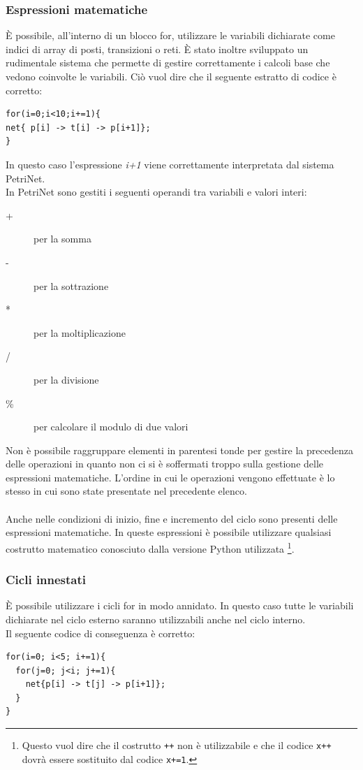 \documentclass[italian,12pt]{book}
\begin{document}
\subsubsection{Espressioni matematiche}
È possibile, all'interno di un blocco for, utilizzare le variabili dichiarate 
come indici di array di posti, transizioni o reti. È stato inoltre sviluppato
un rudimentale sistema che permette di gestire correttamente i calcoli 
base che vedono coinvolte le variabili. Ciò vuol dire che il seguente estratto 
di codice è corretto:
\begin{verbatim}
for(i=0;i<10;i+=1){
net{ p[i] -> t[i] -> p[i+1]};
}
\end{verbatim}
In questo caso l'espressione \emph{i+1} viene correttamente interpretata dal 
sistema PetriNet. \\
In PetriNet sono gestiti i seguenti operandi tra variabili e valori interi:
\begin{description}
\item[+] per la somma 
\item[-] per la sottrazione
\item[*] per la moltiplicazione
\item[/] per la divisione 
\item[\%] per calcolare il modulo di due valori
\end{description}
Non è possibile raggruppare elementi in parentesi tonde per gestire la precedenza
delle operazioni in quanto non ci si è soffermati troppo sulla gestione
delle espressioni matematiche. L'ordine in cui le operazioni vengono effettuate 
è lo stesso in cui sono state presentate nel precedente elenco.\\
\\
Anche nelle condizioni di inizio, fine e incremento del ciclo sono presenti
delle espressioni matematiche. In queste espressioni è possibile utilizzare 
qualsiasi costrutto matematico conosciuto dalla versione Python utilizzata
\footnote{Questo vuol dire che il costrutto {\tt ++} non è utilizzabile e che 
il codice {\tt x++} dovrà essere sostituito dal codice {\tt x+=1}.}.

\subsubsection{Cicli innestati}
È possibile utilizzare i cicli for in modo annidato. In questo caso tutte le 
variabili dichiarate nel ciclo esterno saranno utilizzabili anche nel ciclo 
interno.\\
Il seguente codice di conseguenza è corretto:
\begin{verbatim}
for(i=0; i<5; i+=1){
  for(j=0; j<i; j+=1){
    net{p[i] -> t[j] -> p[i+1]}; 
  }
}
\end{verbatim}
\end{document}

